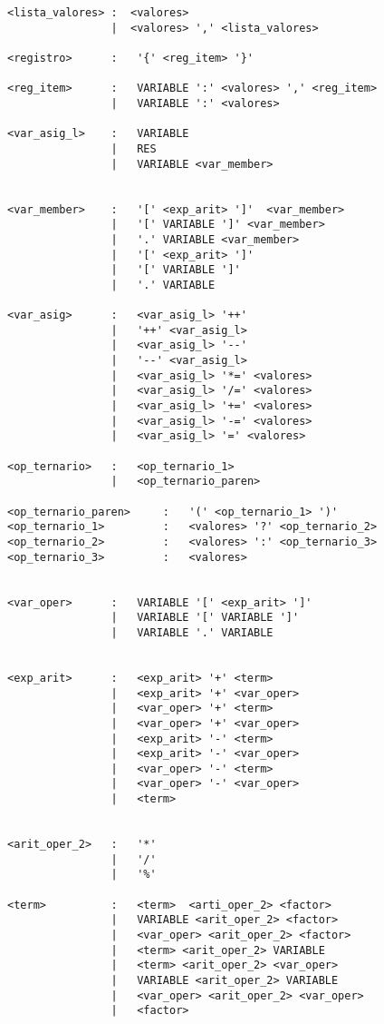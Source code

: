 \begin{verbatim}
<lista_valores> :  <valores>
                |  <valores> ',' <lista_valores>

<registro>      :   '{' <reg_item> '}'

<reg_item>      :   VARIABLE ':' <valores> ',' <reg_item>
                |   VARIABLE ':' <valores> 

<var_asig_l>    :   VARIABLE
                |   RES
                |   VARIABLE <var_member>


<var_member>    :   '[' <exp_arit> ']'  <var_member>
                |   '[' VARIABLE ']' <var_member>
                |   '.' VARIABLE <var_member>
                |   '[' <exp_arit> ']' 
                |   '[' VARIABLE ']' 
                |   '.' VARIABLE 

<var_asig>      :   <var_asig_l> '++'
                |   '++' <var_asig_l>
                |   <var_asig_l> '--'
                |   '--' <var_asig_l>
                |   <var_asig_l> '*=' <valores>
                |   <var_asig_l> '/=' <valores>
                |   <var_asig_l> '+=' <valores>
                |   <var_asig_l> '-=' <valores>
                |   <var_asig_l> '=' <valores>

<op_ternario>   :   <op_ternario_1>
                |   <op_ternario_paren>
                
<op_ternario_paren>     :   '(' <op_ternario_1> ')'
<op_ternario_1>         :   <valores> '?' <op_ternario_2>
<op_ternario_2>         :   <valores> ':' <op_ternario_3>
<op_ternario_3>         :   <valores>


<var_oper>      :   VARIABLE '[' <exp_arit> ']' 
                |   VARIABLE '[' VARIABLE ']' 
                |   VARIABLE '.' VARIABLE 

 
<exp_arit>      :   <exp_arit> '+' <term>
                |   <exp_arit> '+' <var_oper>
                |   <var_oper> '+' <term>
                |   <var_oper> '+' <var_oper>
                |   <exp_arit> '-' <term>
                |   <exp_arit> '-' <var_oper>
                |   <var_oper> '-' <term>
                |   <var_oper> '-' <var_oper>
                |   <term>


<arit_oper_2>   :   '*'
                |   '/'
                |   '%'

<term>          :   <term>  <arti_oper_2> <factor>
                |   VARIABLE <arit_oper_2> <factor>
                |   <var_oper> <arit_oper_2> <factor>
                |   <term> <arit_oper_2> VARIABLE
                |   <term> <arit_oper_2> <var_oper>
                |   VARIABLE <arit_oper_2> VARIABLE
                |   <var_oper> <arit_oper_2> <var_oper> 
                |   <factor>


\end{verbatim}

